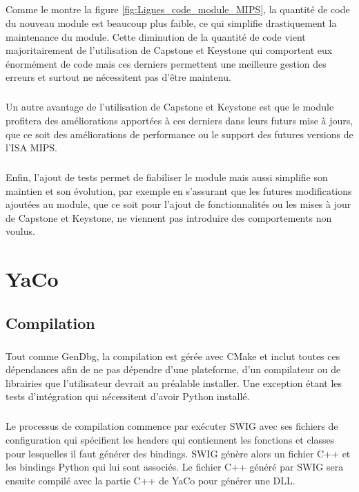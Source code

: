 \documentclass[11pt, book, english, french, standardlists]{upmethodology-document}
\begin{document}
			\paragraph*{}
				Comme le montre la figure \ref{fig:Lignes_code_module_MIPS}, la quantité de code du nouveau module est beaucoup plus faible, ce qui simplifie drastiquement la maintenance du module. Cette diminution de la quantité de code vient majoritairement de l'utilisation de Capstone et Keystone qui comportent eux énormément de code mais ces derniers permettent une meilleure gestion des erreurs et surtout ne nécessitent pas d'être maintenu.
			\paragraph*{}
				Un autre avantage de l'utilisation de Capstone et Keystone est que le module profitera des améliorations apportées à ces derniers dans leurs futurs mise à jours, que ce soit des améliorations de performance ou le support des futures versions de l'\gls{ISA} \gls{MIPS}.
			\paragraph*{}
				Enfin, l'ajout de tests permet de fiabiliser le module mais aussi simplifie son maintien et son évolution, par exemple en s'assurant que les futures modifications ajoutées au module, que ce soit pour l'ajout de fonctionnalités ou les mises à jour de Capstone et Keystone, ne viennent pas introduire des comportements non voulus.
	\chapter{YaCo}\label{ch:yaco}
		\section{Compilation}
			\paragraph*{}
				Tout comme GenDbg, la compilation est gérée avec CMake et inclut toutes ces dépendances afin de ne pas dépendre d'une plateforme, d'un compilateur ou de librairies que l'utilisateur devrait au préalable installer. Une exception étant les tests d'intégration qui nécessitent d'avoir Python installé.
			\paragraph*{}
				Le processus de compilation commence par exécuter \gls{SWIG} avec ses fichiers de configuration qui spécifient les headers qui contiennent les fonctions et classes pour lesquelles il faut générer des bindings. \gls{SWIG} génère alors un fichier C++ et les bindings Python qui lui sont associés. Le fichier C++ généré par \gls{SWIG} sera ensuite compilé avec la partie C++ de YaCo pour générer une \gls{DLL}.
\end{document}
